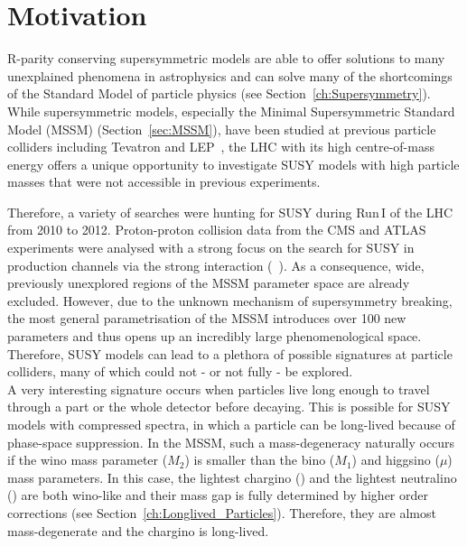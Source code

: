 \FloatBarrier
\chapter{Motivation}
\label{sec:Motivation}
R-parity conserving supersymmetric models are able to offer solutions to many unexplained phenomena in astrophysics and can solve many of the shortcomings of the Standard Model of particle physics (see Section~\ref{ch:Supersymmetry}).
While supersymmetric models, especially the Minimal Supersymmetric Standard Model (MSSM) (Section~\ref{sec:MSSM}), have been studied at previous particle colliders including Tevatron and LEP~\cite{bib:Tevatron:SUSY_results,bib:LEP:SUSY_results}, the LHC with its high centre-of-mass energy offers a unique opportunity to investigate SUSY models with high particle masses that were not accessible in previous experiments.

Therefore, a variety of searches were hunting for SUSY during Run\,I of the LHC from 2010 to 2012.
Proton-proton collision data from the CMS and ATLAS experiments were analysed with a strong focus on the search for SUSY in production channels via the strong interaction (\eg~\cite{bib:CMS:RA2_8TeV,bib:CMS:MT2_8TeV,bib:ATLAS:JetPlusMET_8TeV}).
As a consequence, wide, previously unexplored regions of the MSSM parameter space are already excluded.
However, due to the unknown mechanism of supersymmetry breaking, the most general parametrisation of the MSSM introduces over 100 new parameters and thus opens up an incredibly large phenomenological space. 
Therefore, SUSY models can lead to a plethora of possible signatures at particle colliders, many of which could not - or not fully - be explored. \\

A very interesting signature occurs when particles live long enough to travel through a part or the whole detector before decaying.
This is possible for SUSY models with compressed spectra, in which a particle can be long-lived because of phase-space suppression.
In the MSSM, such a mass-degeneracy naturally occurs if the wino mass parameter ($M_2$) is smaller than the bino ($M_1$) and higgsino ($\mu$) mass parameters.
In this case, the lightest chargino (\chipm) and the lightest neutralino (\chiO) are both wino-like and their mass gap is fully determined by higher order corrections (see Section~\ref{ch:Longlived_Particles}). 
Therefore, they are almost mass-degenerate and the chargino is long-lived.

